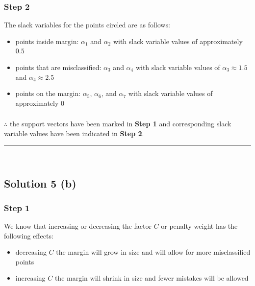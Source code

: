 \documentclass{article}
\begin{document}
\subsubsection*{Step 2}
\parbox{\textwidth}{
The slack variables for the points circled are as follows:
\begin{itemize}
  \item points inside margin: $\alpha_1$ and $\alpha_2$ with slack variable values of approximately $0.5$
  \item points that are misclassified: $\alpha_3$ and $\alpha_4$ with slack variable values of $\alpha_3 \approx 1.5$ and $\alpha_4 \approx 2.5$
  \item points on the margin: $\alpha_5$, $\alpha_6$, and $\alpha_7$ with slack variable values of approximately $0$
\end{itemize}
}

\subsubsection*{\normalfont}{$\therefore$ the support vectors have been marked in \textbf{Step 1} and corresponding slack variable values have been indicated in \textbf{Step 2}.}

\noindent\rule{\textwidth}{0.4pt}\\

\newpage

\subsection*{Solution 5 (b)}
\subsubsection*{Step 1}
\parbox{\textwidth}{
We know that increasing or decreasing the factor $C$ or penalty weight has the following effects:
\begin{itemize}
  \item decreasing $C$ the margin will grow in size and will allow for more misclassified points
  \item increasing $C$ the margin will shrink in size and fewer mistakes will be allowed
\end{itemize}
}
\end{document}
